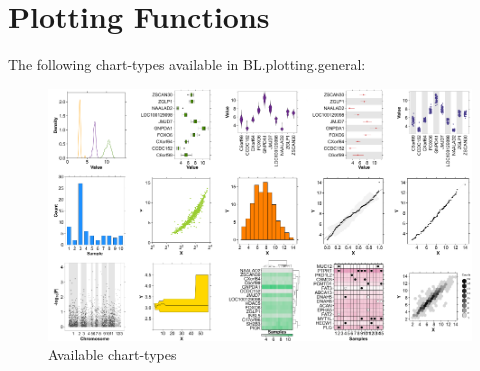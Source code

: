 \documentclass[letterpaper]{report}\usepackage[]{graphicx}\usepackage[]{color}
\begin{document}
\section{Plotting Functions}
The following  chart-types available in BL.plotting.general:

\begin{figure}[!ht]
  \begin{center}
     \includegraphics[width=160mm]{Figures/available_chart_types.png}
     \caption{Available chart-types}
  \end{center}
\end{figure}
\end{document}
